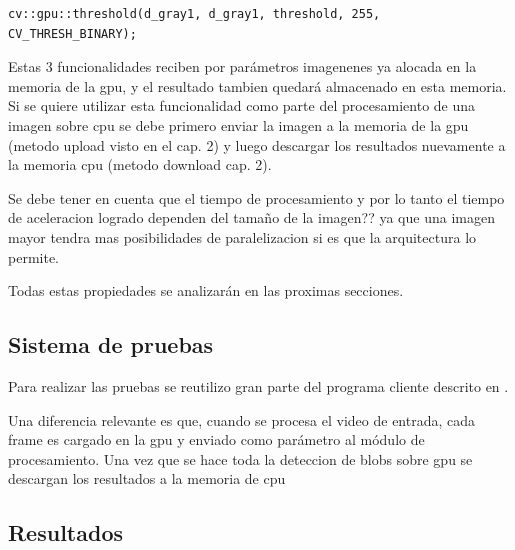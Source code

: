 \documentclass[a4paper,10pt]{report}
\begin{document}
 \begin{lstlisting}[columns=flexible,basicstyle=\ttfamily\small\bfseries]
cv::gpu::threshold(d_gray1, d_gray1, threshold, 255, CV_THRESH_BINARY);
\end{lstlisting}


 
 
 Estas 3 funcionalidades reciben por parámetros imagenenes ya alocada en la memoria de la gpu, y el resultado tambien quedará almacenado en esta memoria.
Si se quiere utilizar esta funcionalidad como parte del procesamiento de una imagen sobre cpu se debe primero enviar la imagen a la memoria de la gpu (metodo upload visto en el cap. 2)
y luego descargar los resultados nuevamente a la memoria cpu (metodo download cap. 2).
 
 Se debe tener en cuenta que el tiempo de procesamiento y por lo tanto el tiempo de aceleracion logrado dependen del tamaño de la imagen?? 
 ya que una imagen mayor tendra mas posibilidades de paralelizacion si es que la arquitectura lo permite.

 Todas estas propiedades se analizarán en las proximas secciones.

 
 
 
 
 
 
 
 
 
 
 
 
 
 
 
 
 
 
\subsection{Sistema de pruebas}
Para realizar las pruebas se reutilizo gran parte del programa cliente descrito en \cite[capitulo 4]{Jaureguiberry}.

Una diferencia relevante es que, cuando se procesa el video de entrada, cada frame es cargado en la gpu y enviado como parámetro al módulo de procesamiento. 
Una vez que se hace toda la deteccion de blobs sobre gpu se descargan los resultados a la memoria de cpu

\subsection{Resultados}
\end{document}
